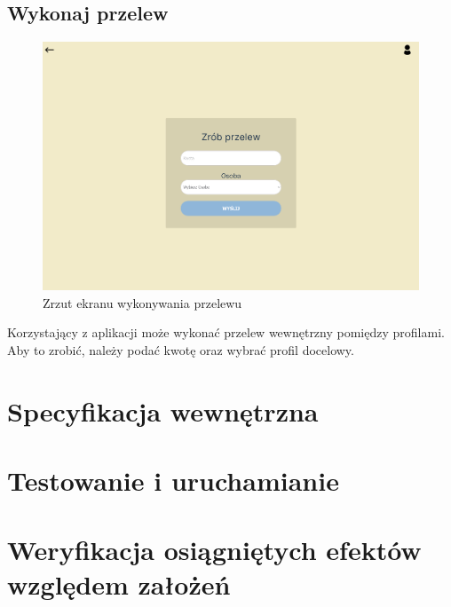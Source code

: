 \documentclass[12pt,a4paper,oneside]{article}
\begin{document}
\subsection{Wykonaj przelew}
\begin{figure}[H]
    \centering
    \includegraphics[width=\hsize,keepaspectratio]{images/make_transfer.png}
    \caption{Zrzut ekranu wykonywania przelewu}
\end{figure}
Korzystający z aplikacji może wykonać przelew wewnętrzny pomiędzy profilami.
Aby to zrobić, należy podać kwotę oraz wybrać profil docelowy.

\section{Specyfikacja wewnętrzna}

\section{Testowanie i uruchamianie}

\section{Weryfikacja osiągniętych efektów względem założeń}
\end{document}
